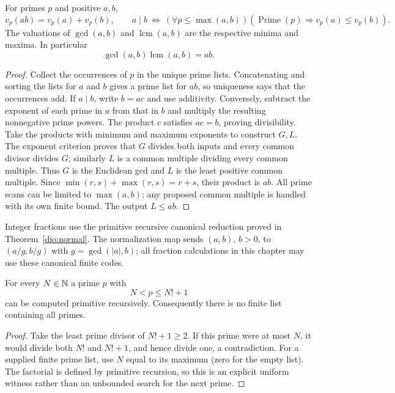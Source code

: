 \begin{theorem}\label{el:valuation}
For primes $p$ and positive $a,b$,
\[
 v_p(ab)=v_p(a)+v_p(b),\qquad
 a\mid b\ \Longleftrightarrow\
       (\forall p\le\max(a,b))
       (\operatorname{Prime}(p)\Longrightarrow v_p(a)\le v_p(b)).
\]
The valuations of $\gcd(a,b)$ and $\operatorname{lcm}(a,b)$ are the
respective minima and maxima.  In particular
\[
 \gcd(a,b)\operatorname{lcm}(a,b)=ab.
\]
\end{theorem}
\begin{proof}
Collect the occurrences of $p$ in the unique prime lists.  Concatenating
and sorting the lists for $a$ and $b$ gives a prime list for $ab$, so
uniqueness says that the occurrences add.  If $a\mid b$, write $b=ac$
and use additivity.  Conversely, subtract the exponent of each prime
in $a$ from that in $b$ and multiply the resulting nonnegative prime
powers.  The product $c$ satisfies $ac=b$, proving divisibility.
Take the products with minimum and maximum exponents to construct $G,L$.
The exponent criterion proves that $G$ divides both inputs and every
common divisor divides $G$; similarly $L$ is a common multiple dividing
every common multiple.  Thus $G$ is the Euclidean gcd and $L$ is the
least positive common multiple.  Since
$\min(r,s)+\max(r,s)=r+s$, their product is $ab$.
All prime scans can be limited to $\max(a,b)$; any proposed common
multiple is handled with its own finite bound.  The output $L\le ab$.
\end{proof}

Integer fractions use the primitive recursive canonical reduction proved in
Theorem~\ref{dio:normal}.  The normalization map sends $(a,b)$, $b>0$,
to $(a/g,b/g)$ with $g=\gcd(|a|,b)$; all fraction calculations in this
chapter may use these canonical finite codes.

\begin{theorem}\label{el:euclid}
For every $N\in\mathbb N$ a prime $p$ with
\[
             N<p\le N!+1
\]
can be computed primitive recursively.  Consequently there is no finite
list containing all primes.
\end{theorem}
\begin{proof}
Take the least prime divisor of $N!+1\ge2$.  If this prime were at most
$N$, it would divide both $N!$ and $N!+1$, and hence divide one, a
contradiction.  For a supplied finite prime list, use $N$ equal to its
maximum (zero for the empty list).  The factorial is defined by primitive
recursion, so this is an explicit uniform witness rather than an
unbounded search for the next prime.
\end{proof}

